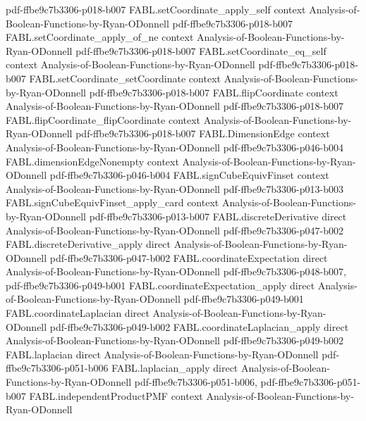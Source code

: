 \begin{theorem}
  {pdf-ffbe9c7b3306-p018-b007}
\proofstep
  {FABL.setCoordinate_apply_self}
  {context}
  {Analysis-of-Boolean-Functions-by-Ryan-ODonnell}
  {pdf-ffbe9c7b3306-p018-b007}
\proofstep
  {FABL.setCoordinate_apply_of_ne}
  {context}
  {Analysis-of-Boolean-Functions-by-Ryan-ODonnell}
  {pdf-ffbe9c7b3306-p018-b007}
\proofstep
  {FABL.setCoordinate_eq_self}
  {context}
  {Analysis-of-Boolean-Functions-by-Ryan-ODonnell}
  {pdf-ffbe9c7b3306-p018-b007}
\proofstep
  {FABL.setCoordinate_setCoordinate}
  {context}
  {Analysis-of-Boolean-Functions-by-Ryan-ODonnell}
  {pdf-ffbe9c7b3306-p018-b007}
\proofstep
  {FABL.flipCoordinate}
  {context}
  {Analysis-of-Boolean-Functions-by-Ryan-ODonnell}
  {pdf-ffbe9c7b3306-p018-b007}
\proofstep
  {FABL.flipCoordinate_flipCoordinate}
  {context}
  {Analysis-of-Boolean-Functions-by-Ryan-ODonnell}
  {pdf-ffbe9c7b3306-p018-b007}
\proofstep
  {FABL.DimensionEdge}
  {context}
  {Analysis-of-Boolean-Functions-by-Ryan-ODonnell}
  {pdf-ffbe9c7b3306-p046-b004}
\proofstep
  {FABL.dimensionEdgeNonempty}
  {context}
  {Analysis-of-Boolean-Functions-by-Ryan-ODonnell}
  {pdf-ffbe9c7b3306-p046-b004}
\proofstep
  {FABL.signCubeEquivFinset}
  {context}
  {Analysis-of-Boolean-Functions-by-Ryan-ODonnell}
  {pdf-ffbe9c7b3306-p013-b003}
\proofstep
  {FABL.signCubeEquivFinset_apply_card}
  {context}
  {Analysis-of-Boolean-Functions-by-Ryan-ODonnell}
  {pdf-ffbe9c7b3306-p013-b007}
\proofstep
  {FABL.discreteDerivative}
  {direct}
  {Analysis-of-Boolean-Functions-by-Ryan-ODonnell}
  {pdf-ffbe9c7b3306-p047-b002}
\proofstep
  {FABL.discreteDerivative_apply}
  {direct}
  {Analysis-of-Boolean-Functions-by-Ryan-ODonnell}
  {pdf-ffbe9c7b3306-p047-b002}
\proofstep
  {FABL.coordinateExpectation}
  {direct}
  {Analysis-of-Boolean-Functions-by-Ryan-ODonnell}
  {pdf-ffbe9c7b3306-p048-b007,
    pdf-ffbe9c7b3306-p049-b001}
\proofstep
  {FABL.coordinateExpectation_apply}
  {direct}
  {Analysis-of-Boolean-Functions-by-Ryan-ODonnell}
  {pdf-ffbe9c7b3306-p049-b001}
\proofstep
  {FABL.coordinateLaplacian}
  {direct}
  {Analysis-of-Boolean-Functions-by-Ryan-ODonnell}
  {pdf-ffbe9c7b3306-p049-b002}
\proofstep
  {FABL.coordinateLaplacian_apply}
  {direct}
  {Analysis-of-Boolean-Functions-by-Ryan-ODonnell}
  {pdf-ffbe9c7b3306-p049-b002}
\proofstep
  {FABL.laplacian}
  {direct}
  {Analysis-of-Boolean-Functions-by-Ryan-ODonnell}
  {pdf-ffbe9c7b3306-p051-b006}
\proofstep
  {FABL.laplacian_apply}
  {direct}
  {Analysis-of-Boolean-Functions-by-Ryan-ODonnell}
  {pdf-ffbe9c7b3306-p051-b006,
    pdf-ffbe9c7b3306-p051-b007}
\proofstep
  {FABL.independentProductPMF}
  {context}
  {Analysis-of-Boolean-Functions-by-Ryan-ODonnell}

\end{theorem}
